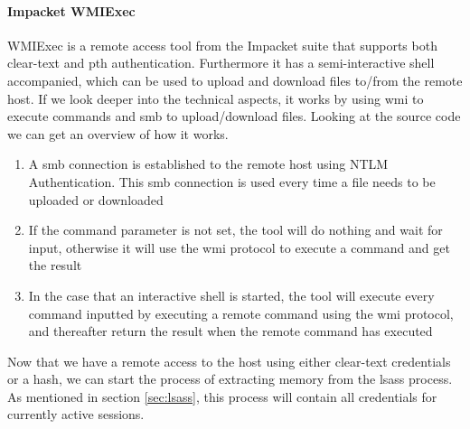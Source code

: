 \documentclass{article}
\begin{document}
\paragraph{Impacket WMIExec} WMIExec is a remote access tool from the Impacket suite that supports both clear-text and \gls{pth} authentication. Furthermore it has a semi-interactive shell accompanied, which can be used to upload and download files to/from the remote host. If we look deeper into the technical aspects, it works by using \gls{wmi} to execute commands and \gls{smb} to upload/download files. Looking at the source code\cite{url:impacket:wmiexec} we can get an overview of how it works.

\begin{enumerate}
    \item A \gls{smb} connection is established to the remote host using NTLM Authentication. This \gls{smb} connection is used every time a file needs to be uploaded or downloaded
    \item If the command parameter is not set, the tool will do nothing and wait for input, otherwise it will use the \gls{wmi} protocol to execute a command and get the result
    \item In the case that an interactive shell is started, the tool will execute every command inputted by executing a remote command using the \gls{wmi} protocol, and thereafter return the result when the remote command has executed
\end{enumerate}

Now that we have a remote access to the host using either clear-text credentials or a hash, we can start the process of extracting memory from the \gls{lsass} process. As mentioned in section \ref{sec:lsass}, this process will contain all credentials for currently active sessions.
\end{document}
